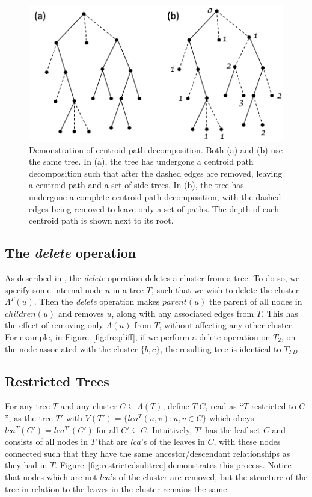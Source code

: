 \documentclass{article}
\newcommand{\leafset}{\Lambda}
\begin{document}
    \begin{figure}[ht]
        \includegraphics[scale=0.5]{centroid}
        \centering
        \caption[Centroid path decomposition]{Demonstration of centroid path decomposition. Both (a) and (b) use the same tree. In (a), the tree has undergone a centroid path decomposition such that after the dashed edges are removed, leaving a centroid path and a set of side trees. In (b), the tree has undergone a complete centroid path decomposition, with the dashed edges being removed to leave only a set of paths. The depth of each centroid path is shown next to its root.}
        \label{fig:centroid}
    \end{figure}

    \subsection{The \textit{delete} operation}
    \label{subsec:delete}

    As described in \cite{jansson2018algorithms}, the \textit{delete} operation deletes a cluster from a tree. To do so, we specify some internal node $u$ in a tree $T$, such that we wish to delete the cluster $\leafset^{T}(u)$. Then the \textit{delete} operation makes $parent(u)$ the parent of all nodes in $children(u)$ and removes $u$, along with any associated edges from $T$. This has the effect of removing only $\leafset(u)$ from $T$, without affecting any other cluster. For example, in Figure~\ref{fig:freqdiff}, if we perform a delete operation on $T_2$, on the node associated with the cluster $\{b, c\}$, the resulting tree is identical to $T_{FD}$.

    \subsection{Restricted Trees}
    For any tree $T$ and any cluster $C \subseteq \leafset(T)$, define $T|C$, read as ``$T$ restricted to $C$'', as the tree $T'$ with $V(T') = \{lca^T(u, v) : u, v \in C\}$ which obeys $lca^T(C') = lca^{T'}(C')$ for all $C' \subseteq C$. Intuitively, $T'$ has the leaf set $C$ and consists of all nodes in $T$ that are $lca$'s of the leaves in $C$, with these nodes connected such that they have the same ancestor/descendant relationships as they had in $T$. Figure~\ref{fig:restrictedsubtree} demonstrates this process. Notice that nodes which are not $lca$'s of the cluster are removed, but the structure of the tree in relation to the leaves in the cluster remains the same.
\end{document}
